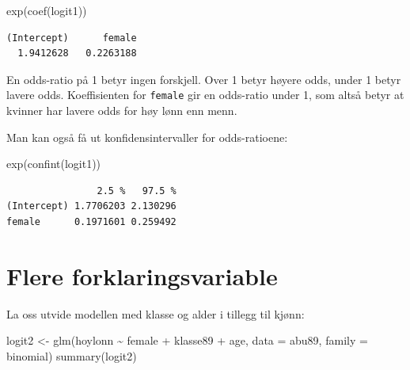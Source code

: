 \documentclass[
  norsk,
  letterpaper,
  DIV=11,
  numbers=noendperiod]{scrreprt}
\newenvironment{Shaded}{\begin{snugshade}}{\end{snugshade}}
\newcommand{\AttributeTok}[1]{\textcolor[rgb]{0.40,0.45,0.13}{#1}}
\newcommand{\FunctionTok}[1]{\textcolor[rgb]{0.28,0.35,0.67}{#1}}
\newcommand{\NormalTok}[1]{\textcolor[rgb]{0.00,0.23,0.31}{#1}}
\newcommand{\OtherTok}[1]{\textcolor[rgb]{0.00,0.23,0.31}{#1}}
\newcommand{\SpecialCharTok}[1]{\textcolor[rgb]{0.37,0.37,0.37}{#1}}
\theoremstyle{definition}
\theoremstyle{remark}
\begin{document}
\begin{Shaded}
\begin{Highlighting}[]
\FunctionTok{exp}\NormalTok{(}\FunctionTok{coef}\NormalTok{(logit1))}
\end{Highlighting}
\end{Shaded}

\begin{verbatim}
(Intercept)      female 
  1.9412628   0.2263188 
\end{verbatim}

En odds-ratio på 1 betyr ingen forskjell. Over 1 betyr høyere odds,
under 1 betyr lavere odds. Koeffisienten for \texttt{female} gir en
odds-ratio under 1, som altså betyr at kvinner har lavere odds for høy
lønn enn menn.

Man kan også få ut konfidensintervaller for odds-ratioene:

\begin{Shaded}
\begin{Highlighting}[]
\FunctionTok{exp}\NormalTok{(}\FunctionTok{confint}\NormalTok{(logit1))}
\end{Highlighting}
\end{Shaded}

\begin{verbatim}
                2.5 %   97.5 %
(Intercept) 1.7706203 2.130296
female      0.1971601 0.259492
\end{verbatim}

\section{Flere forklaringsvariable}\label{flere-forklaringsvariable}

La oss utvide modellen med klasse og alder i tillegg til kjønn:

\begin{Shaded}
\begin{Highlighting}[]
\NormalTok{logit2 }\OtherTok{\textless{}{-}} \FunctionTok{glm}\NormalTok{(hoylonn }\SpecialCharTok{\textasciitilde{}}\NormalTok{ female }\SpecialCharTok{+}\NormalTok{ klasse89 }\SpecialCharTok{+}\NormalTok{ age, }\AttributeTok{data =}\NormalTok{ abu89, }\AttributeTok{family =}\NormalTok{ binomial)}
\FunctionTok{summary}\NormalTok{(logit2)}
\end{Highlighting}
\end{Shaded}
\end{document}
